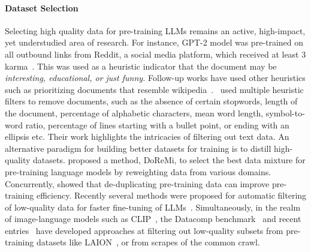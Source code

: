 \paragraph{Dataset Selection}
Selecting high quality data for pre-training LLMs remains an active, high-impact, yet understudied area of research. For instance,
 GPT-2 model was pre-trained on all outbound links from Reddit, a social media platform, which received at least 3 karma~\citep{brown2020language}. This was used as a heuristic indicator that the document may be \emph{interesting, educational, or just funny.}
 Follow-up works have used other heuristics such as prioritizing documents that resemble wikipedia~\citep{gururangan-etal-2022-whose}.~\citet{rae2021scaling}
used multiple heuristic filters to remove documents, such as the absence of certain stopwords, length of the document, percentage of alphabetic characters, 
 mean word length, 
  symbol-to-word ratio, percentage of lines starting with a bullet point, or ending with an ellipsis etc. Their work highlights the intricacies of filtering out text data.
An alternative paradigm for building better datasets for training is to distill high-quality datasets.  \citet{xie2023doremi} proposed a method, DoReMi, to select the best data mixture for pre-training language models by reweighting data from various domains.
Concurrently, \citet{Abbas2023SemDeDupDL} showed that de-duplicating pre-training data can improve pre-training efficiency.
Recently several methods were proposed for automatic filtering of low-quality data for faster fine-tuning of LLMs~\citep{chen2023alpagasus,solaiman2021process,zhou2023lima}. Simultaneously, in the realm of image-language models such as CLIP~\citep{radford2021learning}, the Datacomp benchmark~\citep{gadre2023datacomp} and recent entries~\citep{maini2023t,yu2023devil} have developed approaches at filtering out low-quality subsets from pre-training datasets like LAION~\citep{schuhmann2022laion}, or from scrapes of the common crawl.


